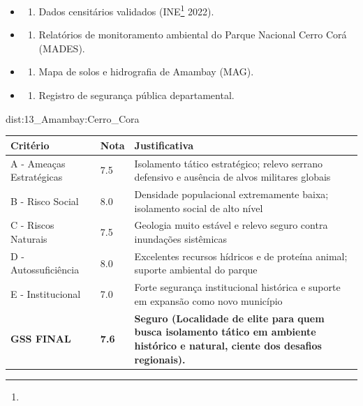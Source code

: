{\begin{itemize}
\tightlist
\item
  \begin{enumerate}
  \def\labelenumi{\arabic{enumi})}
  \tightlist
  \item
    Dados censitários validados (INE\footnote{\fineINE} 2022).
  \end{enumerate}
\item
  \begin{enumerate}
  \def\labelenumi{\arabic{enumi})}
  \setcounter{enumi}{1}
  \tightlist
  \item
    Relatórios de monitoramento ambiental do Parque Nacional Cerro Corá
    (MADES).
  \end{enumerate}
\item
  \begin{enumerate}
  \def\labelenumi{\arabic{enumi})}
  \setcounter{enumi}{2}
  \tightlist
  \item
    Mapa de solos e hidrografia de Amambay (MAG).
  \end{enumerate}
\item
  \begin{enumerate}
  \def\labelenumi{\arabic{enumi})}
  \setcounter{enumi}{3}
  \tightlist
  \item
    Registro de segurança pública departamental.
  \end{enumerate}
\end{itemize}}{dist:13_Amambay:Cerro_Cora}
\begin{table}[ht!]
\small \begin{tabular}{p{3.0cm}p{0.8cm}p{6.0cm}} \toprule
\textbf{Critério} & \textbf{Nota} & \textbf{Justificativa} \\ \midrule
A - Ameaças Estratégicas & 7.5 & Isolamento tático estratégico; relevo serrano defensivo e ausência de alvos militares globais \\
B - Risco Social & 8.0 & Densidade populacional extremamente baixa; isolamento social de alto nível \\
C - Riscos Naturais & 7.5 & Geologia muito estável e relevo seguro contra inundações sistêmicas \\
D - Autossuficiência & 8.0 & Excelentes recursos hídricos e de proteína animal; suporte ambiental do parque \\
E - Institucional & 7.0 & Forte segurança institucional histórica e suporte em expansão como novo município \\
\midrule \textbf{GSS FINAL} & \textbf{7.6} & \textbf{Seguro (Localidade de elite para quem busca isolamento tático em ambiente histórico e natural, ciente dos desafios regionais).} \\ \bottomrule \end{tabular}
\end{table}
